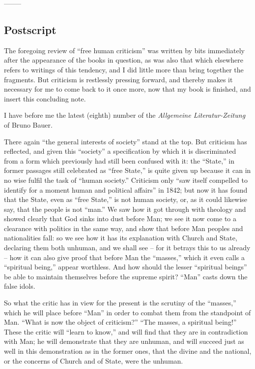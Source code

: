 \begin{center}
--------\end{center}


\subsection[Postscript]{\centering Postscript}

The foregoing review of ``free human criticism'' was written by bits 
immediately after the appearance of the books in question, as was also that 
which elsewhere refers to writings of this tendency, and I did little more 
than bring together the fragments. But criticism is restlessly pressing 
forward, and thereby makes it necessary for me to come back to it once more, 
now that my book is finished, and insert this concluding note.

I have before me the latest (eighth) number of the \textit{Allgemeine 
Literatur-Zeitung} of Bruno Bauer.

There again ``the general interests of society'' stand at the top. But 
criticism has reflected, and given this ``society'' a specification by which 
it is discriminated from a form which previously had still been confused with 
it: the ``State,'' in former passages still celebrated as ``free State,'' 
is quite given up because it can in no wise fulfil the task of ``human 
society.'' Criticism only ``saw itself compelled to identify for a moment 
human and political affairs'' in 1842; but now it has found that the State, 
even as ``free State,'' is not human society, or, as it could likewise say, 
that the people is not ``man.'' We saw how it got through with theology and 
showed clearly that God sinks into dust before Man; we see it now come to a 
clearance with politics in the same way, and show that before Man peoples and 
nationalities fall: so we see how it has its explanation with Church and 
State, declaring them both unhuman, and we shall see -- for it betrays this to 
us already -- how it can also give proof that before Man the ``masses,'' 
which it even calls a ``spiritual being,'' appear worthless. And how should 
the lesser ``spiritual beings'' be able to maintain themselves before the 
supreme spirit? ``Man'' casts down the false idols.

So what the critic has in view for the present is the scrutiny of the 
``masses,'' which he will place before ``Man'' in order to combat them 
from the standpoint of Man. ``What is now the object of criticism?'' ``The 
masses, a spiritual being!'' These the critic will ``learn to know,'' and 
will find that they are in contradiction with Man; he will demonstrate that 
they are unhuman, and will succeed just as well in this demonstration as in 
the former ones, that the divine and the national, or the concerns of Church 
and of State, were the unhuman.

